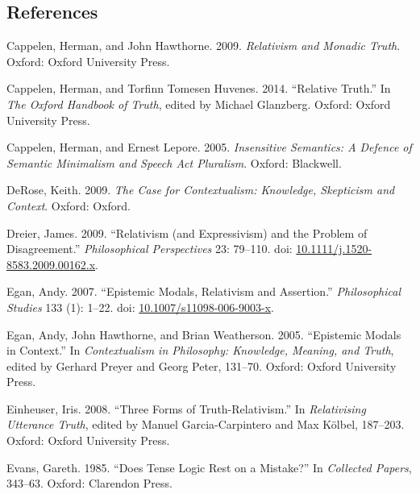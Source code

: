 \documentclass[
  11pt,
  letterpaper,
  DIV=11,
  numbers=noendperiod,
  twoside]{scrartcl}
\newlength{\cslhangindent}
\newenvironment{CSLReferences}[2] %
 {\begin{list}{}{%
  \setlength{\itemindent}{0pt}
  \setlength{\leftmargin}{0pt}
  \setlength{\parsep}{0pt}
  \ifodd #1
   \setlength{\leftmargin}{\cslhangindent}
   \setlength{\itemindent}{-1\cslhangindent}
  \fi
  \setlength{\itemsep}{#2\baselineskip}}}
 {\end{list}}
\begin{document}
\subsection*{References}\label{references}

\label{refs}
\begin{CSLReferences}{1}{0}
Cappelen, Herman, and John Hawthorne. 2009. \emph{Relativism and Monadic
Truth}. Oxford: Oxford University Press.

Cappelen, Herman, and Torfinn Tomesen Huvenes. 2014. {``Relative
Truth.''} In \emph{The Oxford Handbook of Truth}, edited by Michael
Glanzberg. Oxford: Oxford University Press.

Cappelen, Herman, and Ernest Lepore. 2005. \emph{Insensitive Semantics:
A Defence of Semantic Minimalism and Speech Act Pluralism}. Oxford:
Blackwell.

DeRose, Keith. 2009. \emph{The Case for Contextualism: Knowledge,
Skepticism and Context}. Oxford: Oxford.

Dreier, James. 2009. {``Relativism (and Expressivism) and the Problem of
Disagreement.''} \emph{Philosophical Perspectives} 23: 79--110. doi:
\href{https://doi.org/10.1111/j.1520-8583.2009.00162.x}{10.1111/j.1520-8583.2009.00162.x}.

Egan, Andy. 2007. {``{Epistemic Modals, Relativism and Assertion}.''}
\emph{Philosophical Studies} 133 (1): 1--22. doi:
\href{https://doi.org/10.1007/s11098-006-9003-x}{10.1007/s11098-006-9003-x}.

Egan, Andy, John Hawthorne, and Brian Weatherson. 2005. {``{Epistemic
Modals in Context}.''} In \emph{Contextualism in Philosophy: Knowledge,
Meaning, and Truth}, edited by Gerhard Preyer and Georg Peter, 131--70.
Oxford: Oxford University Press.

Einheuser, Iris. 2008. {``Three Forms of Truth-Relativism.''} In
\emph{Relativising Utterance Truth}, edited by Manuel Garcia-Carpintero
and Max Kölbel, 187--203. Oxford: Oxford University Press.

Evans, Gareth. 1985. {``Does Tense Logic Rest on a Mistake?''} In
\emph{Collected Papers}, 343--63. Oxford: Clarendon Press.


\end{CSLReferences}
\end{document}
